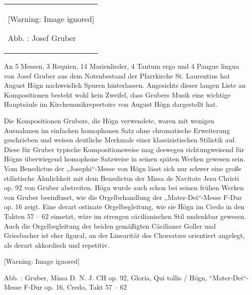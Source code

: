 \documentclass[a4paper]{article}
\newcounter{Abb}
\renewcommand\theAbb{\arabic{Abb}}
\begin{document}
\begin{center}
\begin{minipage}{3.953cm}
\begin{flushleft}
\tablefirsthead{}
\tablehead{}
\tabletail{}
\tablelasttail{}
\begin{supertabular}{m{3.753cm}}
  [Warning: Image ignored] %
 
Abb. \stepcounter{Abb}{\theAbb}: Josef Gruber\\
\end{supertabular}
\end{flushleft}
\end{minipage}
\end{center}
An 5 Messen, 3 Requien, 14 Marienlieder, 4 Tantum ergo und 4 Pangue
lingua von Josef Gruber aus dem Notenbestand der Pfarrkirche St.
Laurentius hat August Högn nachweislich Spuren hinterlassen. Angesichts
dieser langen Liste an Kompositionen besteht wohl kein Zweifel, dass
Grubers Musik eine wichtige Hauptsäule im Kirchemusikrepertoire von
August Högn dargestellt hat.

Die Kompositionen Grubers, die Högn verwendete, waren mit wenigen
Ausnahmen im einfachen homophonen Satz ohne chromatische Erweiterung
geschrieben und weisen deutliche Merkmale einer klassizistischen
Stilistik auf. Diese für Gruber typische Kompositionsweise mag deswegen
richtungweisend für Högns überwiegend homophone Satzweise in seinen
späten Werken gewesen sein. Vom Benedictus der „Josephi“-Messe von Högn
lässt sich nur schwer eine große stilistische Ähnlichkeit mit dem
Benedictus der Missa de Navitate Jesu Christi op. 92 von Gruber
abstreiten. Högn wurde auch schon bei seinen frühen Werken von Gruber
beeinflusst, wie die Orgelbehandlung der „Mater-Dei“-Messe F-Dur op. 16
zeigt. Eine derart ostinate Orgelbegleitung, wie sie Högn im Credo in
den Takten 57 – 62 einsetzt, wäre im strengen cäcilianischen Stil
undenkbar gewesen. Auch die Orgelbegleitung der beiden gemäßigten
Cäcilianer Goller und Griesbacher ist eher figural, an der Linearität
des Chorsatzes orientiert angelegt, als derart akkordisch und
repetitiv.

  [Warning: Image ignored] %
 

Abb. \stepcounter{Abb}{\theAbb}: Gruber, Missa D. N. J. CH op. 92,
Gloria, Qui tollis / Högn, “Mater-Dei“-Messe F-Dur op. 16, Credo, Takt
57 – 62
\end{document}
